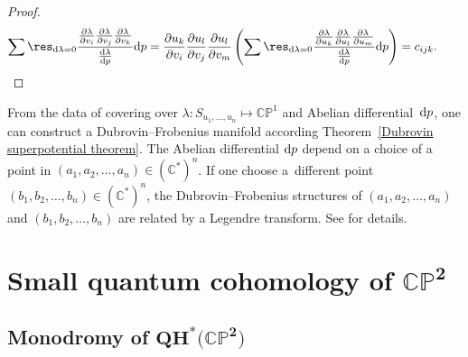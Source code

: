 \begin{proof}
\begin{gather*}
\sum \res_{{\rm d}\lambda=0} \frac{\frac{\partial\lambda}{\partial v_i}\frac{\partial\lambda}{\partial v_j} \frac{\partial\lambda}{\partial v_k}}{\frac{{\rm d}\lambda}{{\rm d}p} }{\rm d}p=\frac{\partial u_k}{\partial v_i}\frac{\partial u_l}{\partial v_j}\frac{\partial u_l}{\partial v_m}\left(\sum \res_{{\rm d}\lambda=0} \frac{\frac{\partial\lambda}{\partial u_k}\frac{\partial\lambda}{\partial u_l} \frac{\partial\lambda}{\partial u_m}}{\frac{{\rm d}\lambda}{{\rm d}p} }{\rm d}p\right)=c_{ijk}.\tag*{\qed}
\end{gather*}
\renewcommand{\qed}{}
\end{proof}

\begin{Remark}
From the data of covering over $\lambda\colon S_{u_1,\dots, u_n}\mapsto\mathbb{CP}^1$ and Abelian differential~${\rm d}p$, one can construct a Dubrovin--Frobenius manifold according Theorem~\ref{Dubrovin superpotential theorem}. The Abelian differential ${\rm d}p$ depend on a choice of a point in $(a_1,a_2,\dots,a_n)\in(\mathbb{C}^{*})^n$. If one choose a~different point~${(b_1,b_2,\dots,b_n)\in(\mathbb{C}^{*})^n}$, the Dubrovin--Frobenius structures of $(a_1,a_2,\dots,a_n)$ and $(b_1,b_2,\dots,b_n)$ are related by a Legendre transform. See \cite[Appendix B, Chapter 5]{B.Dubrovin2} for details.
\end{Remark}

\section[Small quantum cohomology of $\mathbb{CP}^2$]{Small quantum cohomology of $\boldsymbol{\mathbb{CP}^2}$}\label{small Quantum Cohomolology}

\subsection[Monodromy of $\mathbb{CP}^2$]{Monodromy of $\boldsymbol{QH^{*}\bigl(\mathbb{CP}^2\bigr)}$}

